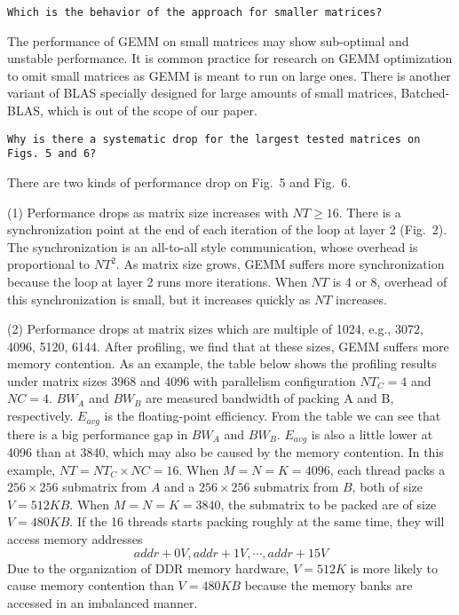 \documentclass[]{article}
\begin{document}
\begin{verbatim}
Which is the behavior of the approach for smaller matrices?
\end{verbatim}

The performance of GEMM on small matrices may show sub-optimal
and unstable performance.
It is common practice for research on GEMM optimization to omit small
matrices as GEMM is meant to run on large ones.
There is another variant of BLAS specially designed for
large amounts of small matrices,
Batched-BLAS, which is out of the scope of our paper.

\begin{verbatim}
Why is there a systematic drop for the largest tested matrices on
Figs. 5 and 6?
\end{verbatim}

There are two kinds of performance drop on Fig.~5 and Fig.~6.

(1) Performance drops as matrix size increases with $NT \ge 16$.
There is a synchronization point at the end of each iteration
of the loop at layer 2 (Fig.~2).
The synchronization is an all-to-all style
communication, whose overhead is proportional to $NT^2$.
As matrix size grows, GEMM suffers more synchronization because
the loop at layer 2 runs more iterations.
When $NT$ is 4 or 8, overhead of this synchronization is small,
but it increases quickly as $NT$ increases.

(2) Performance drops at matrix sizes which are multiple of 1024,
e.g., 3072, 4096, 5120, 6144. 
After profiling, we find that at these sizes,
GEMM suffers more memory contention.
As an example, the table below shows the profiling results
under matrix sizes 3968 and 4096
with parallelism configuration $NT_C=4$ and $NC=4$.
$BW_{A}$ and $BW_{B}$ are measured bandwidth of packing A and B, respectively.
$E_{avg}$ is the floating-point efficiency.
From the table we can see that there is a big performance gap
in $BW_{A}$ and $BW_{B}$.
$E_{avg}$ is also a little lower at 4096 than at 3840,
which may also be caused by the memory contention.
In this example, $NT=NT_C \times NC=16$.
When $M=N=K=4096$, each thread packs a $256 \times 256$ submatrix
from $A$ and a $256 \times 256$ submatrix from $B$,
both of size $V=512KB$.
When $M=N=K=3840$, the submatrix to be packed are of size $V=480KB$.
If the 16 threads starts packing roughly at the same time,
they will access memory addresses
$$addr+0V, addr+1V, \cdots, addr+15V$$
Due to the organization of DDR memory hardware,
$V=512K$ is more likely to cause memory contention than $V=480KB$
because the memory banks are accessed in an imbalanced manner.
\end{document}
